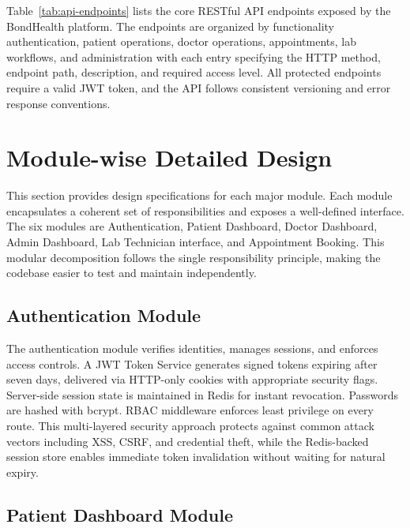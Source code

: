 \noindent Table~\ref{tab:api-endpoints} lists the core RESTful API endpoints exposed by the BondHealth platform. The endpoints are organized by functionality authentication, patient operations, doctor operations, appointments, lab workflows, and administration with each entry specifying the HTTP method, endpoint path, description, and required access level. All protected endpoints require a valid JWT token, and the API follows consistent versioning and error response conventions.
\FloatBarrier


\section{Module-wise Detailed Design}

\justifying
\noindent This section provides design specifications for each major module. Each module encapsulates a coherent set of responsibilities and exposes a well-defined interface. The six modules are Authentication, Patient Dashboard, Doctor Dashboard, Admin Dashboard, Lab Technician interface, and Appointment Booking. This modular decomposition follows the single responsibility principle, making the codebase easier to test and maintain independently.

\subsection{Authentication Module}

\justifying
\noindent The authentication module verifies identities, manages sessions, and enforces access controls. A JWT Token Service generates signed tokens expiring after seven days, delivered via HTTP-only cookies with appropriate security flags. Server-side session state is maintained in Redis for instant revocation. Passwords are hashed with bcrypt. RBAC middleware enforces least privilege on every route. This multi-layered security approach protects against common attack vectors including XSS, CSRF, and credential theft, while the Redis-backed session store enables immediate token invalidation without waiting for natural expiry.

\subsection{Patient Dashboard Module}

